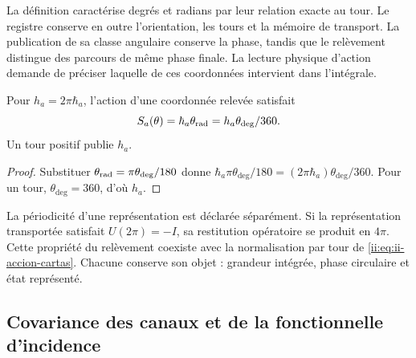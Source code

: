 La définition caractérise degrés et radians par leur relation exacte
au tour. Le registre conserve en outre l'orientation, les tours et
la mémoire de transport. La publication de sa classe angulaire conserve
la phase, tandis que le relèvement distingue des parcours de même
phase finale. La lecture physique d'action demande de préciser laquelle de
ces coordonnées intervient dans l'intégrale.

\begin{proposition}
Pour \(h_a=2\pi\hbar_a\), l'action d'une coordonnée relevée
satisfait
\begin{equation}
 \mathcal S_a(\theta)
 =\hbar_a\theta_{\rm rad}
 =h_a\frac{\theta_{\deg}}{360}.
 \label{ii:eq:ii-accion-cartas}
\end{equation}
Un tour positif publie \(h_a\).
\end{proposition}
\begin{proof}
Substituer \(\theta_{\rm rad}=\pi\theta_{\deg}/180\) donne
\(\hbar_a\pi\theta_{\deg}/180
=(2\pi\hbar_a)\theta_{\deg}/360\). Pour un tour,
\(\theta_{\deg}=360\), d'où \(h_a\).
\end{proof}

La périodicité d'une représentation est déclarée séparément. Si la
représentation transportée satisfait \(U(2\pi)=-I\), sa restitution
opératoire se produit en \(4\pi\). Cette propriété du relèvement
coexiste avec la normalisation par tour de
\eqref{ii:eq:ii-accion-cartas}. Chacune conserve son objet : grandeur
intégrée, phase circulaire et état représenté.

\subsection{Covariance des canaux et de la fonctionnelle d'incidence}

